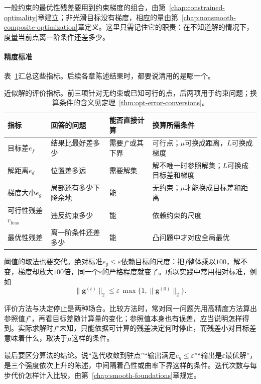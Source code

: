 一般约束的最优性残差要用到约束梯度的组合，由第~\ref{chap:constrained-optimality}章建立；非光滑目标没有梯度，相应的量由第~\ref{chap:nonsmooth-composite-optimization}章定义。这里只需记住它的职责：在不知道解的情况下，度量当前点离一阶条件还差多少。

\paragraph{精度标准}
表~\ref{tab:opt-metrics}汇总这些指标。后续各章陈述结果时，都要说清用的是哪一个。

\begin{table}[!htbp]
  \centering
  \begin{tabular}{@{}llll@{}}
    \toprule
    指标 & 回答的问题 & 能否直接计算 & 换算所需条件\\
    \midrule
    目标差$e_f$ & 结果比最好差多少 & 需要$f^\star$或其下界 & 可行点；$\mu$可换成距离，$L$可换成梯度\\
    解距离$e_d$ & 位置差多远 & 需要解集 & 解不唯一时参照解集；$L$可换成目标差和梯度\\
    梯度大小$e_g$ & 局部还有多少下降余地 & 能 & 无约束；$\mu$才能换成目标差和距离\\
    可行性残差$r_{\mathrm{feas}}$ & 违反约束多少 & 能 & 依赖约束的尺度\\
    最优性残差 & 离一阶条件还差多少 & 能 & 凸问题中才对应全局最优\\
    \bottomrule
  \end{tabular}
  \caption{近似解的评价指标。前三项针对无约束或已知可行的点，后两项用于约束问题；换算条件的含义见定理~\ref{thm:opt-error-conversions}。}
  \label{tab:opt-metrics}
\end{table}

阈值的取法也要交代。绝对标准$e_g\leq\varepsilon$依赖目标的尺度：把$f$整体乘以$100$，解不变，梯度却放大$100$倍，同一个$\varepsilon$的严格程度就变了。所以实践中常用相对标准，例如
\begin{equation}
 \lVert\bm{g}^{(t)}\rVert_2\leq\varepsilon\,\max\bigl\{1,\lVert\bm{g}^{(0)}\rVert_2\bigr\}.
 \label{eq:opt-relative-stopping}
\end{equation}

评价方法与决定停止是两种场合。比较方法时，常对同一问题先用高精度方法算出参照值$f^\star$，再看目标差随计算量的变化；参照值本身也有误差，应当说明怎样得到。实际求解时$f^\star$未知，只能依据可计算的残差决定何时停止，而残差小对目标差意味着什么，取决于$\mu$这样的条件。

最后要区分算法的结论。说“迭代收敛到驻点”“输出满足$e_g\leq\varepsilon$”“输出是$\varepsilon$最优解”，是三个强度依次上升的陈述，中间隔着凸性或曲率下界这样的条件。迭代次数与每步代价怎样计入比较，由第~\ref{chap:smooth-foundations}章规定。
